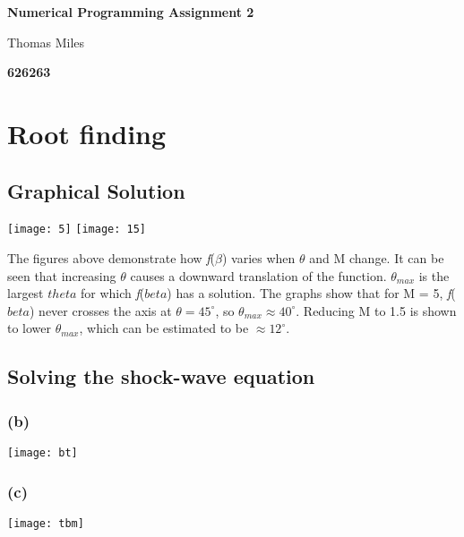 \documentclass[10pt, twocolumn]{article}
\begin{document}
\begin{titlepage}
   \begin{center}
       \vspace*{1cm}
 
       \textbf{Numerical Programming Assignment 2}
 
       \vspace{0.5cm}
        Thomas Miles
 
       \vspace{1.5cm}
 
       \textbf{626263}
 
       \vfill
 

       \vspace{0.8cm}

 
   \end{center}
\end{titlepage}

\setcounter{section}{1}
\section{Root finding}
	\setcounter{subsection}{1}
	\subsection{Graphical Solution}
	\texttt{[image: 5]}
	\texttt{[image: 15]}

	The figures above demonstrate how \textit{f}($\beta$) varies when $\theta$ and M change. It can be seen that increasing $\theta$ causes a downward translation of the function. $\theta_{max}$ is the largest $theta$ for which \textit{f}($beta$) has a solution. The graphs show that for M = 5, \textit{f}($beta$) never crosses the axis at $\theta = 45^{\circ}$, so $\theta_{max} \approx 40^{\circ}$. Reducing M to 1.5 is shown to lower $\theta_{max}$, which can be estimated to be $\approx 12^{\circ}$. 
	
	\subsection{Solving the shock-wave equation}
		\subsubsection*{\quad(b)}
		\texttt{[image: bt]}
		\subsubsection*{\quad(c)}
		\texttt{[image: tbm]}
\end{document}
